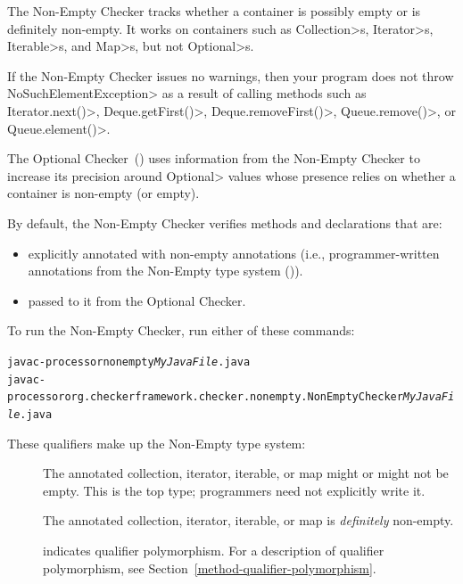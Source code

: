 
The Non-Empty Checker tracks whether a container is possibly empty or is
definitely non-empty.  It works on containers such as
\<Collection>s, \<Iterator>s, \<Iterable>s, and \<Map>s, but not \<Optional>s.

If the Non-Empty Checker issues no warnings, then your program does not
throw \<NoSuchElementException> as a result of calling methods such as
\<Iterator.next()>,
\<Deque.getFirst()>, \<Deque.removeFirst()>, \<Queue.remove()>, or
\<Queue.element()>.

The Optional Checker~() uses information from the
Non-Empty Checker to increase its precision around \<Optional> values whose
presence relies on whether a container is non-empty (or empty).

By default, the Non-Empty Checker verifies methods and
declarations that are:
\begin{itemize}

\item explicitly annotated with non-empty annotations (i.e., programmer-written
  annotations from the Non-Empty type system
  ()).
\item passed to it from the Optional Checker.

\end{itemize}

To run the Non-Empty Checker, run either of these commands:

\begin{alltt}
  javac -processor nonempty \emph{MyJavaFile}.java
  javac -processor org.checkerframework.checker.nonempty.NonEmptyChecker \emph{MyJavaFile}.java
\end{alltt}



These qualifiers make up the Non-Empty type system:

\begin{description}

\item[]
  The annotated collection, iterator, iterable, or map might or might not be empty.
  This is the top type; programmers need not explicitly write it.

\item[]
  The annotated collection, iterator, iterable, or map is \emph{definitely}
  non-empty.

\item[]
  indicates qualifier polymorphism.
  For a description of qualifier polymorphism, see
  Section~\ref{method-qualifier-polymorphism}.

\end{description}

